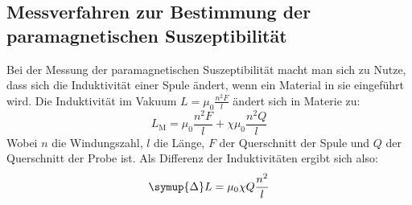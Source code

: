 \subsection{Messverfahren zur Bestimmung der paramagnetischen Suszeptibilität}
\label{sec:mess}
Bei der Messung der paramagnetischen Suszeptibilität macht man sich zu Nutze, dass sich die Induktivität einer Spule ändert, wenn ein Material in sie eingeführt wird. Die Induktivität im Vakuum $L = \mu_0 \frac{n^2 F}{l}$ ändert sich in Materie zu:
\begin{equation}
    L_\text{M} = \mu_0 \frac{n^2 F}{l} + \chi \mu_0 \frac{n^2 Q}{l} 
\end{equation}
Wobei $n$ die Windungszahl, $l$ die Länge, $F$ der Querschnitt der Spule und $Q$ der Querschnitt der Probe ist.
Als Differenz der Induktivitäten ergibt sich also: 
\begin{equation}
    \symup{\Delta} L = \mu_0 \chi Q \frac{n^2}{l} 
\end{equation}

